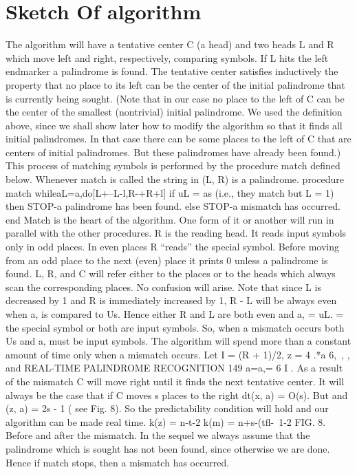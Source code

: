 \documentclass[11pt,a4paper]{report}
\begin{document}
\chapter{Sketch Of algorithm}
The algorithm will have a tentative center C (a head) and two heads L and R which
move left and right, respectively, comparing symbols. If L hits the left endmarker a
palindrome is found. The tentative center satisfies inductively the property that no place
to its left can be the center of the initial palindrome that is currently being sought.
(Note that in our case no place to the left of C can be the center of the smallest (nontrivial)
initial palindrome. We used the definition above, since we shall show later how to modify
the algorithm so that it finds all initial palindromes. In that case there can be some places
to the left of C that are centers of initial palindromes. But these palindromes have already
been found.) This process of matching symbols is performed by the procedure match
defined below. Whenever match is called the string in (L, R) is a palindrome.
procedure match
whileaL=a,do[L+--L-l,R-+R+l]
if uL = as (i.e., they match but L = 1)
then STOP-a palindrome has been found.
else STOP-a mismatch has occurred.
end
Match is the heart of the algorithm. One form of it or another will run in parallel with
the other procedures. R is the reading head. It reads input symbols only in odd places.
In even places R “reads” the special symbol. Before moving from an odd place to the
next (even) place it prints 0 unless a palindrome is found. L, R, and C will refer either to
the places or to the heads which always scan the corresponding places. No confusion will
arise. Note that since L is decreased by 1 and R is immediately increased by 1, R - L
will be always even when a, is compared to Us. Hence either R and L are both even and
a, = uL. = the special symbol or both are input symbols. So, when a mismatch occurs
both Us and a, must be input symbols. The algorithm will spend more than a constant
amount of time only when a mismatch occurs. Let I = (R + 1)/2, z = 4 .*a 6,~, , and 
REAL-TIME PALINDROME RECOGNITION 149
a=a,= 6 I . As a result of the mismatch C will move right until it finds the next
tentative center. It will always be the case that if C moves s places to the right dt(x, a) =
O(s). But  and (z, a) = 2s - 1 ( see Fig. 8). So the predictability condition will hold and
our algorithm can be made real time.
k(z) = n-t-2
k(m) = n+s-(tfl-~1-2
FIG. 8. Before and after the mismatch.
In the sequel we always assume that the palindrome which is sought has not been
found, since otherwise we are done. Hence if match stops, then a mismatch has occurred.
\end{document}
